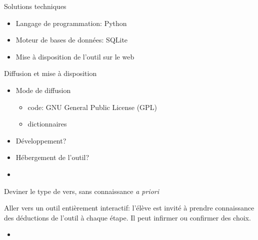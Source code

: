 \documentclass{beamer}
\begin{document}
\begin{frame}{Solutions techniques}

\begin{itemize}
\item Langage de programmation: Python
\item Moteur de bases de données: SQLite
\item Mise à disposition de l'outil sur le web
\end{itemize}
\end{frame} %


\begin{frame}{Diffusion et mise à disposition}

\begin{itemize}
\item Mode de diffusion

\begin{itemize}
\item code: GNU General Public License (GPL)
\item dictionnaires
\end{itemize}

\item Développement?

\item Hébergement de l'outil?

\end{itemize}
\end{frame} %


\begin{frame}{}

\begin{itemize}
\item
\end{itemize}

Deviner le type de vers, sans connaissance \emph{a priori}

Aller vers un outil entièrement interactif: l'élève est invité à prendre connaissance des déductions de l'outil à chaque étape. Il peut infirmer ou confirmer des choix.

\end{frame} %



\begin{frame}{}

\begin{itemize}
\item
\end{itemize}
\end{frame} %
\end{document}
